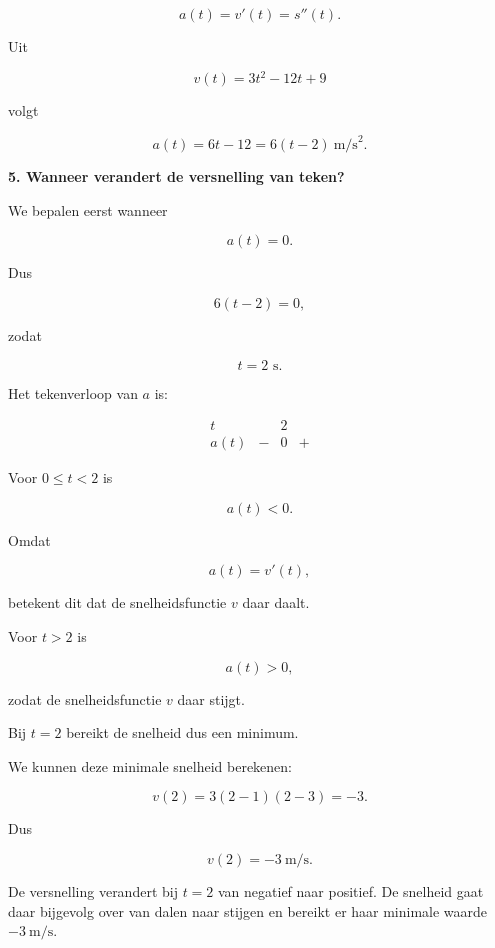 \documentclass{ximera}
\begin{document}
\begin{oefening}{\oefU\ESS}
\begin{oplossing}
  \[
  a(t)=v'(t)=s''(t).
  \]
  
  Uit
  
  \[
  v(t)=3t^2-12t+9
  \]
  
  volgt
  
  \[
  \boxed{a(t)=6t-12=6(t-2)\ \text{m/s}^2.}
  \]
  
  \textbf{5. Wanneer verandert de versnelling van teken?}
  
  We bepalen eerst wanneer
  
  \[
  a(t)=0.
  \]
  
  Dus
  
  \[
  6(t-2)=0,
  \]
  
  zodat
  
  \[
  \boxed{t=2\text{ s}.}
  \]
  
  Het tekenverloop van $a$ is:
  
  \[
  \begin{array}{c|ccc}
  t
  & & 2 & \\ \hline
  a(t)
  & - & 0 & +
  \end{array}
  \]
  
  Voor $0\leq t<2$ is
  
  \[
  a(t)<0.
  \]
  
  Omdat
  
  \[
  a(t)=v'(t),
  \]
  
  betekent dit dat de snelheidsfunctie $v$ daar daalt.
  
  Voor $t>2$ is
  
  \[
  a(t)>0,
  \]
  
  zodat de snelheidsfunctie $v$ daar stijgt.
  
  Bij $t=2$ bereikt de snelheid dus een minimum.
  
  We kunnen deze minimale snelheid berekenen:
  
  \[
  v(2)
  =3(2-1)(2-3)
  =-3.
  \]
  
  Dus
  
  \[
  \boxed{v(2)=-3\ \text{m/s}.}
  \]
  
  De versnelling verandert bij $t=2$ van negatief naar positief.
  De snelheid gaat daar bijgevolg over van dalen naar stijgen en
  bereikt er haar minimale waarde $-3\ \text{m/s}$.
  
  \end{oplossing}

\end{oefening}


\end{document}
